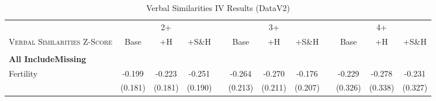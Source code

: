 \begin{landscape}\begin{table}[htpb!]\caption{Verbal Similarities IV Results (DataV2)}
\label{TWINtab:IVAll}
\begin{center}\begin{tabular}{lcccp{2mm}cccp{2mm}ccc}
\toprule \toprule 
&\multicolumn{3}{c}{2+}&&\multicolumn{3}{c}{3+}&&\multicolumn{3}{c}{4+}\\ \cmidrule(r){2-4} \cmidrule(r){6-8} \cmidrule(r){10-12} 
\textsc{Verbal Similarities Z-Score}&Base&+H&+S\&H&&Base&+H&+S\&H&&Base&+H&+S\&H\\ \midrule 
\begin{footnotesize}\end{footnotesize}& 
\begin{footnotesize}\end{footnotesize}& 
\begin{footnotesize}\end{footnotesize}& 
\begin{footnotesize}\end{footnotesize}& 
\begin{footnotesize}\end{footnotesize}& 
\begin{footnotesize}\end{footnotesize}& 
\begin{footnotesize}\end{footnotesize}& 
\begin{footnotesize}\end{footnotesize}& 
\begin{footnotesize}\end{footnotesize}& 
\begin{footnotesize}\end{footnotesize}& 
\begin{footnotesize}\end{footnotesize}& 
\begin{footnotesize}\end{footnotesize}\\ 
\multicolumn{12}{l}{\textbf{All IncludeMissing}}\\ 
Fertility&-0.199&-0.223&-0.251&&-0.264&-0.270&-0.176&&-0.229&-0.278&-0.231\\
&(0.181)&(0.181)&(0.190)&&(0.213)&(0.211)&(0.207)&&(0.326)&(0.338)&(0.327)\\

\end{tabular}
\end{center}
\end{table}
\end{landscape}
